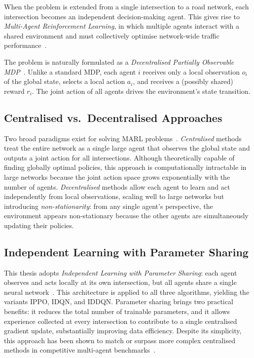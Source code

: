 When the problem is extended from a single intersection to a road network,
each intersection becomes an independent decision-making agent. This gives rise to
\textit{Multi-Agent Reinforcement Learning}, in which multiple agents
interact with a shared environment and must collectively optimise network-wide
traffic performance~\cite{zhang2019integrating}.

The problem is naturally formulated as a \textit{Decentralised Partially Observable
MDP}~\cite{oliehoek2016concise}. Unlike a standard MDP, each agent $i$
receives only a local observation $o_i$ of the global state, selects a local action
$a_i$, and receives a (possibly shared) reward $r_i$. The joint action of all agents
drives the environment's state transition.

\subsection{Centralised vs.\ Decentralised Approaches}

Two broad paradigms exist for solving MARL problems~\cite{terry2020revisiting}.
\textit{Centralised} methods treat the entire network as a single large agent that
observes the global state and outputs a joint action for all intersections.
Although theoretically capable of finding globally optimal policies, this approach
is computationally intractable in large networks because the joint action space
grows exponentially with the number of agents. \textit{Decentralised} methods allow
each agent to learn and act independently from local observations, scaling well to
large networks but introducing \textit{non-stationarity}: from any single agent's
perspective, the environment appears non-stationary because the other agents are
simultaneously updating their policies.

\subsection{Independent Learning with Parameter Sharing}

This thesis adopts \textit{Independent Learning with Parameter Sharing}: each agent
observes and acts locally at its own intersection, but all agents share a single
neural network~\cite{terry2020revisiting}. This architecture is applied to all three
algorithms, yielding the variants IPPO, IDQN, and IDDQN. Parameter sharing brings
two practical benefits: it reduces the total number of trainable parameters, and it
allows experience collected at every intersection to contribute to a single
centralised gradient update, substantially improving data efficiency. Despite its
simplicity, this approach has been shown to match or surpass more complex
centralised methods in competitive multi-agent
benchmarks~\cite{dewitt2020independent}.

